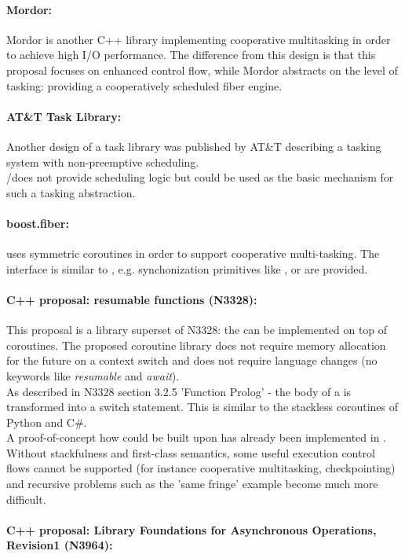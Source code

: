\paragraph*{Mordor:}
Mordor\cite{mordor} is another C++ library implementing cooperative multitasking
in order to achieve high I/O performance. The difference from this design is
that this proposal focuses on enhanced control flow, while Mordor\cite{mordor}
abstracts on the level of tasking: providing a cooperatively scheduled fiber
engine.

\paragraph*{AT\&T Task Library:}
Another design of a task library was published by AT\&T\cite{atnt1989}
describing a tasking system with non-preemptive scheduling.\\
\pushcoro/\pullcoro does not provide scheduling logic but could be used as the
basic mechanism for such a tasking abstraction.

\paragraph*{boost.fiber:}
\boostfiber uses symmetric coroutines in order to support cooperative multi-tasking.
The interface is similar to , e.g. synchonization primitives
like , or  are provided.

\paragraph*{C++ proposal: resumable functions (N3328\cite{n3328}):}
This proposal is a library superset of N3328: the \resumfn can be implemented
on top of coroutines. The proposed coroutine library does not require memory allocation
for the future on a context switch and does not require language changes (no keywords
like \textit{resumable} and \textit{await}).\\
As described in N3328 section 3.2.5 'Function Prolog' - the body of a \resumfn is
transformed into a switch statement. This is similar to the stackless coroutines
of Python and C\#.\\
A proof-of-concept how \await could be built upon \boostcoroutine has already been
implemented in \awaitemu.\\
\newline
Without stackfulness and first-class semantics, some useful execution control
flows cannot be supported (for instance cooperative multitasking,
checkpointing) and recursive problems such as the 'same fringe' example become
much more difficult.

\paragraph*{C++ proposal: Library Foundations for Asynchronous Operations, Revision1
(N3964\cite{n3964}):}
